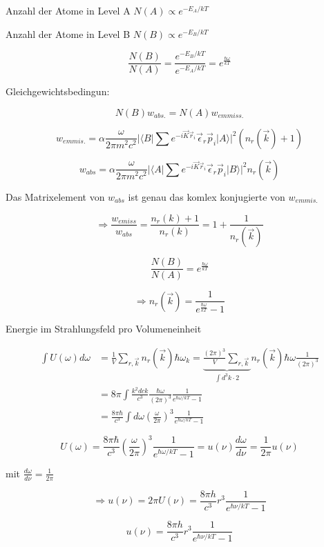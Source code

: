 Anzahl der Atome in Level A \(N(A)\propto e^{-E_A/kT}\)

Anzahl der Atome in Level B \(N(B)\propto e^{-E_B/kT}\)

\[\frac{N(B)}{N(A)} = \frac{e^{-E_B/kT}}{e^{-E_A/kT}} = e^{\frac{\hbar \omega}{kT}}\]

Gleichgewichtsbedingun:

\[N(B) w_{abs.} = N(A)w_{emmiss.}\]


\[w_{emmis.} = \alpha \frac{\omega}{2\pi m^2c^2}|\langle B|\sum e^{-i\vec K\vec r_i}\vec \epsilon_r\vec p_i|A\rangle |^2(n_r(\vec k)+1)\]

\[w_{abs} = \alpha \frac{\omega}{2\pi m^2c^2}|\langle A|\sum e^{-i\vec K\vec r_i}\vec \epsilon_r\vec p_i|B\rangle |^2n_r(\vec k)\]

Das Matrixelement von \(w_{abs}\) ist genau das komlex konjugierte von \(w_{emmis.}\)

\[\Rightarrow \frac{w_{emiss}}{w_{abs}} = \frac{n_r(k)+1}{n_r(k)} = 1+\frac{1}{n_r(\vec k)}\]

\[\frac{N(B)}{N(A)} = e^{\frac{\hbar\omega}{kT}}\]


\[\Rightarrow \boxed{n_r(\vec k) = \frac{1}{e^{\frac{\hbar\omega}{kT}}-1} } \]


Energie im Strahlungsfeld pro Volumeneinheit

\begin{align}
\int U(\omega)d\omega &= \frac{1}{V} \sum_{r,\vec k}n_r(\vec k) \hbar \omega_k = \underbrace{\frac{(2\pi)^3}{V}\sum_{r,\vec k}}_{\int d^3 k\cdot 2}  n_r(\vec k)\hbar\omega \frac{1}{(2\pi)^3}\\
&=8\pi \int \frac{k^2 dck}{c^3}\frac{\hbar\omega}{(2\pi)^3}\frac{1}{e^{\hbar\omega/kT}-1}\\
&= \frac{8\pi\hbar}{c^3}\int d\omega (\frac{\omega}{2\pi})^3 \frac{1}{e^{\hbar\omega/kT}-1}
\end{align}


\[U(\omega) = \frac{8\pi\hbar}{c^3} (\frac{\omega}{2\pi})^3 \frac{1}{e^{\hbar\omega/kT}-1} = u(\nu) \frac{d\omega}{d\nu} = \frac{1}{2\pi}u(\nu) \]

mit \(\frac{d\omega}{d\nu} = \frac{1}{2\pi}\)

\[\Rightarrow u(\nu) = 2\pi U(\nu) = \frac{8\pi h}{c^3} r^3 \frac{1}{e^{\hbar\nu/kT}-1} \]

\[\boxed{ u(\nu)= \frac{8\pi h}{c^3} r^3 \frac{1}{e^{\hbar\nu/kT}-1}  }  \]






